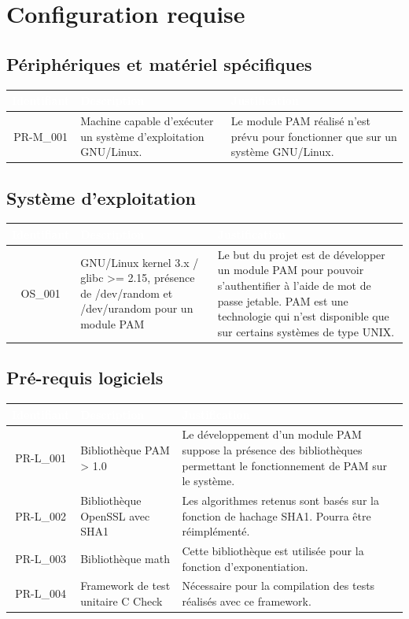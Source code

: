 \documentclass{"../../res/univ-projet"}
\begin{document}
\section{Configuration requise}

\subsection{Périphériques et matériel spécifiques}
\begin{tabular}{|c|p{}|p{}|}
\hline
\rowcolor{gray}
\textcolor{white}{\bfseries Identifiant} & 
\textcolor{white}{\bfseries Description} &
\textcolor{white}{\bfseries Justification} \\
\hline
PR-M\_001 &
Machine capable d'exécuter un système d'exploitation GNU/Linux. & 
Le module PAM réalisé n'est prévu pour fonctionner que sur un système GNU/Linux. \\
\hline
\end{tabular}

\subsection{Système d'exploitation}
\begin{tabular}{|c|p{}|p{}|}
\hline
\rowcolor{gray}
\textcolor{white}{\bfseries Identifiant} & 
\textcolor{white}{\bfseries Description} &
\textcolor{white}{\bfseries Justification} \\
\hline
OS\_001& 
GNU/Linux kernel 3.x / glibc >= 2.15, présence de /dev/random et /dev/urandom 
pour un module PAM &
Le but du projet est de développer un module PAM pour pouvoir s'authentifier
à l'aide de mot de passe jetable. PAM est une technologie qui n'est disponible
que sur certains systèmes de type UNIX.\\
\hline
\end{tabular}

\subsection{Pré-requis logiciels}
\begin{tabular}{|c|p{}|p{}|}
\hline
\rowcolor{gray}
\textcolor{white}{\bfseries Identifiant} & 
\textcolor{white}{\bfseries Description} &
\textcolor{white}{\bfseries Justification} \\
\hline
PR-L\_001 &
Bibliothèque PAM > 1.0 &
Le développement d'un module PAM suppose la présence des bibliothèques permettant
le fonctionnement de PAM sur le système. \\
\hline
PR-L\_002 &
Bibliothèque OpenSSL avec SHA1 &
Les algorithmes retenus sont basés sur la fonction de hachage SHA1. Pourra être réimplémenté. \\
\hline
PR-L\_003 &
Bibliothèque math &
Cette bibliothèque est utilisée pour la fonction d'exponentiation. \\
\hline
PR-L\_004 &
Framework de test unitaire C Check &
Nécessaire pour la compilation des tests réalisés avec ce framework.\\
\hline
\end{tabular}
\end{document}
